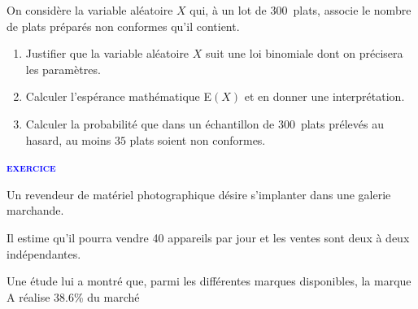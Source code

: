 \documentclass[a4paper,12pt]{article}
\newcommand{\cadre}[1]{%
\psframebox[framesep=.8em,linecolor=black,linewidth=0.25pt,framearc=0]{\begin{minipage}{\linewidth-1.6em}%
#1\end{minipage}}}
\newcounter{nexo}    %
\newcommand{\exo}{%
  \stepcounter{nexo} 
  \par{\textsf{\textbf{\textcolor{blue}{{\textsc{exercice  \arabic{nexo}}}}}}}
  }%
\begin{document}
\begin{enumerate}
On considère la variable aléatoire $X$ qui, à un lot de $300$~plats, associe le nombre
de plats préparés non conformes qu'il contient.
	\begin{enumerate}
		\item Justifier que la variable aléatoire $X$ suit une loi binomiale dont on précisera
les paramètres.

\cadre{
\vspace{5cm}\hspace{18cm}
}

		\item Calculer l'espérance mathématique E$(X)$ et en donner une interprétation.
		
		\cadre{
\vspace{2cm}\hspace{18cm}
}

		\item Calculer la probabilité que dans un échantillon de $300$~plats prélevés au
hasard, au moins $35$ plats soient non conformes.

\cadre{
\vspace{3cm}\hspace{18cm}
}
 	\end{enumerate}
 	
 	\end{enumerate}

 
 \bigskip
 
 \exo
 
 \medskip
 
Un revendeur de matériel photographique désire s'implanter dans une galerie marchande.

Il estime qu'il pourra vendre 40 appareils par jour et les ventes sont deux à deux indépendantes.

Une étude lui a montré que, parmi les différentes marques disponibles, la marque A réalise 38.6\% du marché
\end{document}
